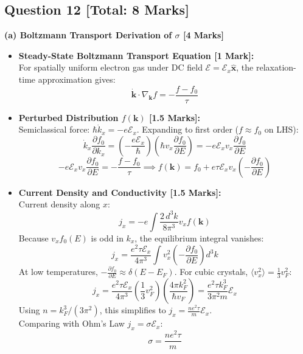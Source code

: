 \documentclass[10pt,a4paper,twocolumn]{article}
\begin{document}
\subsection*{Question 12 [Total: 8 Marks]}
\textbf{(a) Boltzmann Transport Derivation of $\sigma$ [4 Marks]}
\begin{itemize}
    \item \textbf{Steady-State Boltzmann Transport Equation [1 Mark]:}\\
    For spatially uniform electron gas under DC field $\bm{\mathcal{E}} = \mathcal{E}_x \hat{\bm{x}}$, the relaxation-time approximation gives:
    $$\dot{\bm{k}} \cdot \nabla_{\bm{k}} f = -\frac{f - f_0}{\tau}$$
    \item \textbf{Perturbed Distribution $f(\bm{k})$ [1.5 Marks]:}\\
    Semiclassical force: $\hbar \dot{k}_x = -e\mathcal{E}_x$. Expanding to first order ($f \approx f_0$ on LHS):
    $$\dot{k}_x \frac{\partial f_0}{\partial k_x} = \left(-\frac{e\mathcal{E}_x}{\hbar}\right)\left(\hbar v_x \frac{\partial f_0}{\partial E}\right) = -e\mathcal{E}_x v_x \frac{\partial f_0}{\partial E}$$
    $$-e\mathcal{E}_x v_x \frac{\partial f_0}{\partial E} = -\frac{f - f_0}{\tau} \implies f(\bm{k}) = f_0 + e\tau \mathcal{E}_x v_x \left(-\frac{\partial f_0}{\partial E}\right)$$
    \item \textbf{Current Density and Conductivity [1.5 Marks]:}\\
    Current density along $x$:
    $$j_x = -e \int \frac{2\, d^3 k}{8\pi^3} v_x f(\bm{k})$$
    Because $v_x f_0(E)$ is odd in $k_x$, the equilibrium integral vanishes:
    $$j_x = \frac{e^2 \tau \mathcal{E}_x}{4\pi^3} \int v_x^2 \left(-\frac{\partial f_0}{\partial E}\right) d^3 k$$
    At low temperatures, $-\frac{\partial f_0}{\partial E} \approx \delta(E - E_F)$. For cubic crystals, $\langle v_x^2 \rangle = \frac{1}{3}v_F^2$:
    $$j_x = \frac{e^2 \tau \mathcal{E}_x}{4\pi^3}\left(\frac{1}{3}v_F^2\right) \left(\frac{4\pi k_F^2}{\hbar v_F}\right) = \frac{e^2 \tau k_F^3}{3\pi^2 m}\mathcal{E}_x$$
    Using $n = k_F^3/(3\pi^2)$, this simplifies to $j_x = \frac{n e^2 \tau}{m} \mathcal{E}_x$.\\
    Comparing with Ohm's Law $j_x = \sigma \mathcal{E}_x$:
    $$\sigma = \frac{n e^2 \tau}{m}$$
\end{itemize}
\end{document}
